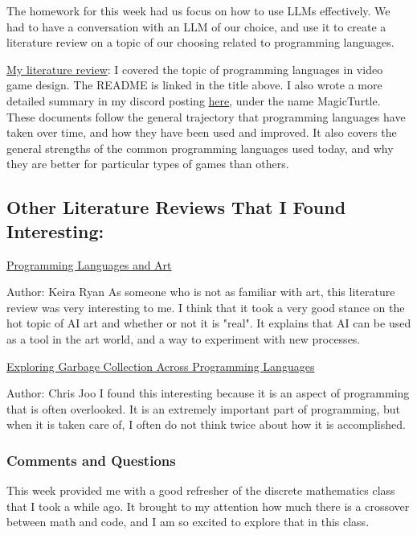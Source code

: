 \documentclass{article}
\theoremstyle{theorem}
\theoremstyle{definition}
\theoremstyle{remark}
\begin{document}
The homework for this week had us focus on how to use LLMs effectively. We had to have
a conversation with an LLM of our choice, and use it to create a literature review
on a topic of our choosing related to programming languages. 

\href{https://github.com/egarof00/CPSC354-HW3}{My literature review}:
I covered the topic of programming languages in video game design. The README is linked in the title above. 
I also wrote a more detailed summary in my discord posting \href{https://discord.com/channels/1277862531226013750/1278164700076707892/1285026014057070632}{here},
under the name MagicTurtle. These documents follow the general trajectory that programming languages have taken over time, and how
they have been used and improved. It also covers the general strengths of the common programming languages used today, and why
they are better for particular types of games than others.

\subsection*{Other Literature Reviews That I Found Interesting:}
\href{https://github.com/keira-ryan/question/blob/main/README.md}{Programming Languages and Art}

Author: Keira Ryan 
As someone who is not as familiar with art, this literature review was very interesting to me.
I think that it took a very good stance on the hot topic of AI art and whether or not
it is "real". It explains that AI can be used as a tool in the art world, and a way to 
experiment with new processes. 

\href{https://github.com/cjoo03/HW3/blob/main/README.md}{Exploring Garbage Collection Across Programming Languages}

Author: Chris Joo
I found this interesting because it is an aspect of programming that is often overlooked.
It is an extremely important part of programming, but when it is taken care of, I often
do not think twice about how it is accomplished. 


\subsubsection*{Comments and Questions}

This week provided me with a good refresher of the discrete mathematics class that I took a while ago. It brought to my attention how much
there is a crossover between math and code, and I am so excited to explore that in this class.
\end{document}
